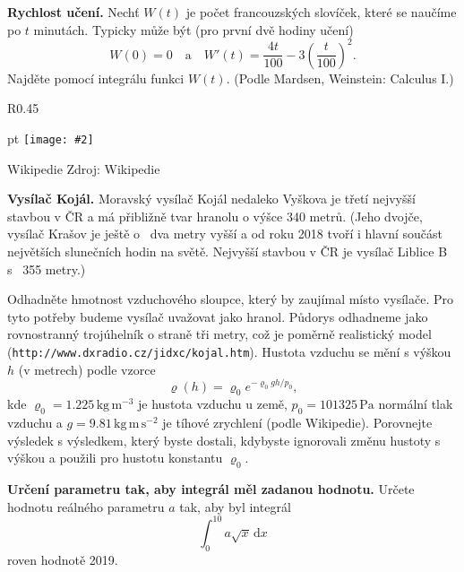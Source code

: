 \documentclass{article}
\def\zlomek{0.45}
\let\rho\varrho
\def\nic{}
\newcommand\obrazek[2][pixabay.com]{
  \clearpage
  \def\test{#1}
\begin{wrapfigure}{R}{\zlomek\linewidth}
  \begin{minipage}{1.0\linewidth}\parskip 0 pt
  \texttt{[image: \#2]}

  \vspace*{-10pt}
  \ifx\test\nic\else
  \null\hfill{\color{gray}\footnotesize Zdroj: #1}
  \fi

  \mezera
  \end{minipage}
\end{wrapfigure}
}
\let\oldtextbf\textbf
\def\textbf#1{%
  \oldtextbf{\color{red} #1}}
\def\mezera{\vspace*{10pt}}
\begin{document}
\textbf{Rychlost učení.} Nechť $W(t)$ je počet francouzských slovíček,
které se naučíme po $t$ minutách. Typicky může být (pro první dvě hodiny učení)
$$W(0)=0\quad \text {a} \quad W'(t)=\frac{4t}{100}-3\left (\frac  t{100}\right)^2.$$ Najděte pomocí integrálu funkci $W(t)$. (Podle Mardsen, Weinstein: Calculus I.)


\newpage

\def\mezera{\vspace*{-20pt}}

\obrazek[Wikipedie]{kojal.jpg}


\textbf{Vysílač Kojál.} Moravský vysílač Kojál nedaleko Vyškova
je třetí nejvyšší stavbou v ČR a má přibližně tvar hranolu o výšce 340
metrů. (Jeho dvojče, vysílač Krašov je ještě o~ dva metry vyšší a od
roku 2018 tvoří i hlavní součást největších slunečních hodin na
světě. Nejvyšší stavbou v ČR je vysílač Liblice B s~ 355 metry.)

Odhadněte hmotnost vzduchového sloupce, který by zaujímal místo
vysílače. Pro tyto potřeby budeme vysílač uvažovat jako
hranol. Půdorys odhadneme jako rovnostranný trojúhelník o straně tři
metry, což je poměrně realistický model
(\texttt{http://www.dxradio.cz/jidxc/kojal.htm}). Hustota vzduchu se
mění s výškou $h$ (v metrech) podle vzorce
$$\rho(h)=\rho_0 e^{-\rho_0 g h /p_0},$$ kde
$\rho_0=1.225 \,\mathrm{kg}\,\mathrm{m}^{-3}$ je hustota vzduchu u země,
$p_0=101325\,\mathrm{Pa}$ normální tlak vzduchu a
$g=9.81\,\mathrm{kg}\,\mathrm{m}\,\mathrm{s}^{-2}$ je tíhové zrychlení (podle Wikipedie).
Porovnejte výsledek s výsledkem, který byste dostali, kdybyste
ignorovali změnu hustoty s výškou a použili pro hustotu konstantu
$\rho_0.$

\newpage

\textbf{Určení parametru tak, aby integrál měl zadanou hodnotu.}
Určete hodnotu reálného parametru $a$ tak, aby byl integrál $$\int_0^{10} a \sqrt x\,\mathrm dx$$
roven hodnotě 2019. 
\end{document}
